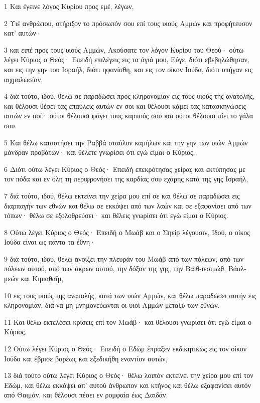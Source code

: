 \par 1 Και έγεινε λόγος Κυρίου προς εμέ, λέγων,
\par 2 Υιέ ανθρώπου, στήριξον το πρόσωπόν σου επί τους υιούς Αμμών και προφήτευσον κατ' αυτών·
\par 3 και ειπέ προς τους υιούς Αμμών, Ακούσατε τον λόγον Κυρίου του Θεού· ούτω λέγει Κύριος ο Θεός· Επειδή επιλέγεις εις τα άγιά μου, Εύγε, διότι εβεβηλώθησαν, και εις την γην του Ισραήλ, διότι ηφανίσθη, και εις τον οίκον Ιούδα, διότι υπήγαν εις αιχμαλωσίαν,
\par 4 διά τούτο, ιδού, θέλω σε παραδώσει προς κληρονομίαν εις τους υιούς της ανατολής, και θέλουσι θέσει τας επαύλεις αυτών εν σοι και θέλουσι κάμει τας κατασκηνώσεις αυτών εν σοί· ούτοι θέλουσι φάγει τους καρπούς σου και ούτοι θέλουσι πίει το γάλα σου.
\par 5 Και θέλω καταστήσει την Ραββά σταύλον καμήλων και την γην των υιών Αμμών μάνδραν προβάτων· και θέλετε γνωρίσει ότι εγώ είμαι ο Κύριος.
\par 6 Διότι ούτω λέγει Κύριος ο Θεός· Επειδή επεκρότησας χείρας και εκτύπησας με τον πόδα και εν όλη τη περιφρονήσει της καρδίας σου εχάρης κατά της γης Ισραήλ,
\par 7 διά τούτο, ιδού, θέλω εκτείνει την χείρα μου επί σε και θέλω σε παραδώσει εις διαρπαγήν των εθνών και θέλω σε εκκόψει από των λαών και σε εξαφανίσει από των τόπων· θέλω σε εξολοθρεύσει· και θέλεις γνωρίσει ότι εγώ είμαι ο Κύριος.
\par 8 Ούτω λέγει Κύριος ο Θεός· Επειδή ο Μωάβ και ο Σηείρ λέγουσιν, Ιδού, ο οίκος Ιούδα είναι ως πάντα τα έθνη·
\par 9 διά τούτο, ιδού, θέλω ανοίξει την πλευράν του Μωάβ από των πόλεων, από των πόλεων αυτού, από των άκρων αυτού, την δόξαν της γης, την Βαιθ-ιεσιμώθ, Βάαλ-μεών και Κιριαθαΐμ,
\par 10 εις τους υιούς της ανατολής, κατά των υιών Αμμών, και θέλω παραδώσει αυτήν εις κληρονομίαν, διά να μη μνημονεύωνται οι υιοί Αμμών μεταξύ των εθνών.
\par 11 Και θέλω εκτελέσει κρίσεις επί τον Μωάβ· και θέλουσι γνωρίσει ότι εγώ είμαι ο Κύριος.
\par 12 Ούτω λέγει Κύριος ο Θεός· Επειδή ο Εδώμ έπραξεν εκδικητικώς εις τον οίκον Ιούδα και έβρισε βαρέως και εξεδικήθη εναντίον αυτών,
\par 13 διά τούτο ούτω λέγει Κύριος ο Θεός· θέλω λοιπόν εκτείνει την χείρα μου επί τον Εδώμ, και θέλω εκκόψει απ' αυτού άνθρωπον και κτήνος και θέλω εξαφανίσει αυτόν από Θαιμάν, και θέλουσι πέσει εν ρομφαία έως Δαιδάν.
